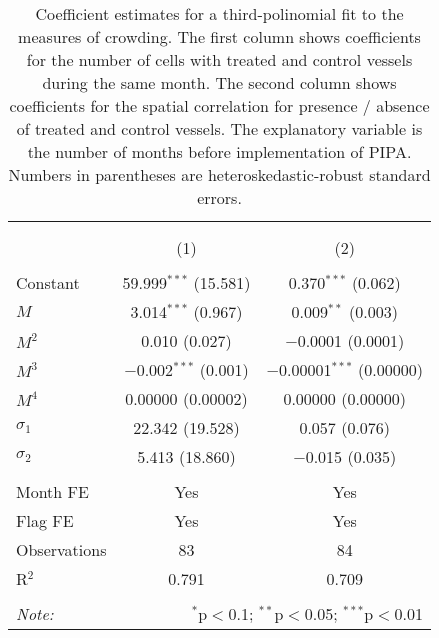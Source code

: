 
\begin{table}[!htbp] \centering 
  \caption{\label{tab:sp_corr}Coefficient estimates for a third-polinomial fit to the measures of crowding. The first column shows coefficients for the number of cells with treated and control vessels during the same month. The second column shows coefficients for the spatial correlation for presence / absence of treated and control vessels. The explanatory variable is the number of months before implementation of PIPA. Numbers in parentheses are heteroskedastic-robust standard errors.} 
  \label{} 
\footnotesize 
\begin{tabular}{@{\extracolsep{1pt}}lcc} 
\\[-1.8ex]\hline 
\hline \\[-1.8ex] 
\\[-1.8ex] & (1) & (2)\\ 
\hline \\[-1.8ex] 
 Constant & 59.999$^{***}$ (15.581) & 0.370$^{***}$ (0.062) \\ 
  $M$ & 3.014$^{***}$ (0.967) & 0.009$^{**}$ (0.003) \\ 
  $M^2$ & 0.010 (0.027) & $-$0.0001 (0.0001) \\ 
  $M^3$ & $-$0.002$^{***}$ (0.001) & $-$0.00001$^{***}$ (0.00000) \\ 
  $M^4$ & 0.00000 (0.00002) & 0.00000 (0.00000) \\ 
  $\sigma_1$ & 22.342 (19.528) & 0.057 (0.076) \\ 
  $\sigma_2$ & 5.413 (18.860) & $-$0.015 (0.035) \\ 
 \hline \\[-1.8ex] 
Month FE & Yes & Yes \\ 
Flag FE & Yes & Yes \\ 
Observations & 83 & 84 \\ 
R$^{2}$ & 0.791 & 0.709 \\ 
\hline 
\hline \\[-1.8ex] 
\textit{Note:}  & \multicolumn{2}{r}{$^{*}$p$<$0.1; $^{**}$p$<$0.05; $^{***}$p$<$0.01} \\ 
\end{tabular} 
\end{table} 
